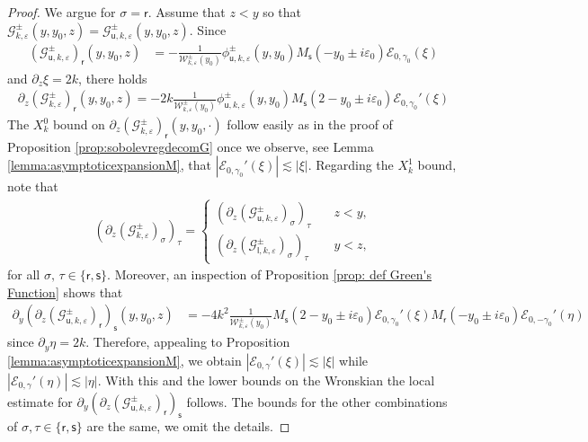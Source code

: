 \documentclass[11pt,reqno]{amsproc}
\theoremstyle{definition}
\numberwithin{equation}{section}
\newcommand{\E}{{\mathcal E}}
\newcommand{\G}{{\mathcal{G}}}
\newcommand{\sr}{{\mathsf{r}}}
\newcommand{\s}{{\mathsf{s}}}
\newcommand{\su}{{\mathsf{u}}}
\renewcommand{\sl}{{\mathsf{l}}}
\newcommand{\W}{{\mathcal{W}}}
\newcommand{\ep}{\varepsilon}
\begin{document}
\begin{proof}
We argue for $\sigma=\sr$. Assume that $z < y$ so that $\G_{k,\ep}^\pm(y,y_0,z) = \G_{\su,k,\ep}^\pm(y,y_0,z)$. Since
\begin{align*}
\left( \G_{\su,k,\ep}^\pm\right)_\sr(y,y_0,z) &= -\frac{1}{\W_{k,\ep}^\pm(y_0)}\phi_{\su,k,\ep}^\pm(y,y_0)M_\s( - y_0 \pm i\ep_0) \mathcal{E}_{0,\gamma_0}(\xi)
\end{align*}
and $\partial_z\xi=2k$, there holds 
\begin{align*}
\partial_z \left( \G_{k,\ep}^\pm\right)_\sr(y,y_0,z) = -2k\frac{1}{\W_{k,\ep}^\pm(y_0)}\phi_{\su,k,\ep}^\pm(y,y_0)M_\s(2 - y_0 \pm i\ep_0) \mathcal{E}_{0,\gamma_0}'(\xi)
\end{align*}
The $X_k^0$ bound on $\partial_z \left( \G_{k,\ep}^\pm\right)_\sr(y,y_0,\cdot)$ follow easily as in the proof of Proposition \ref{prop:sobolevregdecomG} once we observe, see Lemma \ref{lemma:asymptoticexpansionM}, that $\left| \mathcal{E}_{0,\gamma_0}'(\xi) \right| \lesssim |\xi|$. 
Regarding the $X_k^1$ bound, note that
\begin{align*}
\left( \partial_z \left( \G_{k,\ep}^\pm \right)_\sigma \right)_\tau = \begin{cases}
\left( \partial_z \left( \G_{\su,k,\ep}^\pm \right)_\sigma \right)_\tau & \quad z<y, \\
\left( \partial_z \left( \G_{\sl,k,\ep}^\pm \right)_\sigma \right)_\tau & \quad y<z, 
\end{cases} 
\end{align*}
for all $\sigma,\,\tau\in \lbrace \sr, \s \rbrace$. Moreover, an inspection of Proposition \ref{prop: def Green's Function} shows that
\begin{align*}
\partial_y\left(\partial_z \left( \G_{\su,k,\ep}^\pm\right)_\sr\right)_{\s}(y,y_0,z) &= -4k^2\frac{1}{\W_{k,\ep}^\pm(y_0)}M_\s(2 - y_0 \pm i\ep_0) \mathcal{E}_{0,\gamma_0}'(\xi)M_\sr( - y_0\pm i\ep_0)\mathcal{E}_{0,-\gamma_0}'(\eta)
\end{align*}
since $\partial_y\eta = 2k$. Therefore, appealing to Proposition \ref{lemma:asymptoticexpansionM}, we obtain $|\E_{0,\gamma}'(\xi)|\lesssim |\xi|$ while $|\E_{0,\gamma}'(\eta)|\lesssim |\eta|$. With this and the lower bounds on the Wronskian the local estimate for $\partial_y\left(\partial_z \left( \G_{\su,k,\ep}^\pm\right)_\sr\right)_{\s}$ follows. The bounds for the other combinations of $\sigma,\tau\in \lbrace \sr, \s \rbrace$ are the same, we omit the details.


\end{proof}
\end{document}
